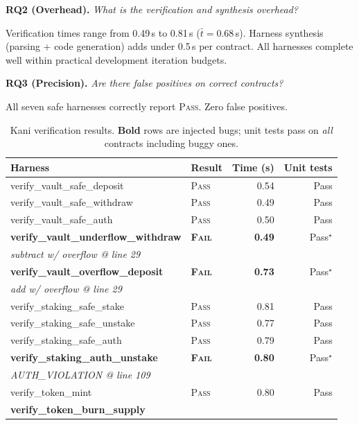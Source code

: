 \documentclass[sigconf,review,anonymous]{acmart}
\begin{document}
\noindent\textbf{RQ2 (Overhead).}
\emph{What is the verification and synthesis overhead?}

Verification times range from 0.49\,s to 0.81\,s
($\bar{t} = 0.68$\,s).
Harness synthesis (parsing + code generation) adds under 0.5\,s per
contract.
All harnesses complete well within practical development iteration
budgets.

\noindent\textbf{RQ3 (Precision).}
\emph{Are there false positives on correct contracts?}

All seven safe harnesses correctly report \textsc{Pass}.
Zero false positives.

\begin{table}[t]
\caption{Kani verification results. \textbf{Bold} rows are injected
  bugs; unit tests pass on \emph{all} contracts including buggy ones.}
\label{tab:results}
\setlength\tabcolsep{4pt}
\footnotesize
\begin{tabular}{llrr}
\toprule
\textbf{Harness} & \textbf{Result} & \textbf{Time (s)} &
  \textbf{Unit tests}\\
\midrule
verify\_vault\_safe\_deposit   & \textsc{Pass} & 0.54 & Pass \\
verify\_vault\_safe\_withdraw  & \textsc{Pass} & 0.49 & Pass \\
verify\_vault\_safe\_auth      & \textsc{Pass} & 0.50 & Pass \\
\midrule
\textbf{verify\_vault\_underflow\_withdraw}
  & \textbf{\textsc{Fail}} & \textbf{0.49} & Pass$^\star$ \\
\quad\textit{subtract w/ overflow @ line 29} & & & \\
\textbf{verify\_vault\_overflow\_deposit}
  & \textbf{\textsc{Fail}} & \textbf{0.73} & Pass$^\star$ \\
\quad\textit{add w/ overflow @ line 29} & & & \\
\midrule
verify\_staking\_safe\_stake   & \textsc{Pass} & 0.81 & Pass \\
verify\_staking\_safe\_unstake & \textsc{Pass} & 0.77 & Pass \\
verify\_staking\_safe\_auth    & \textsc{Pass} & 0.79 & Pass \\
\midrule
\textbf{verify\_staking\_auth\_unstake}
  & \textbf{\textsc{Fail}} & \textbf{0.80} & Pass$^\star$ \\
\quad\textit{AUTH\_VIOLATION @ line 109} & & & \\
\midrule
verify\_token\_mint            & \textsc{Pass} & 0.80 & Pass \\
\textbf{verify\_token\_burn\_supply}

\end{tabular}
\end{table}
\end{document}
